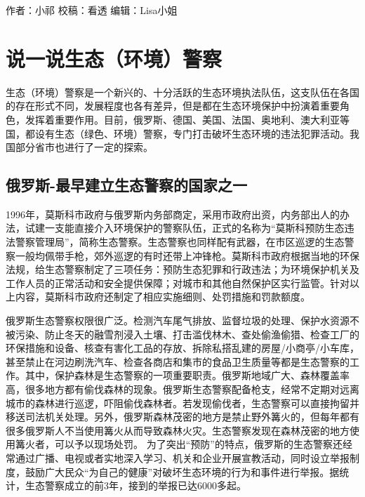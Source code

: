 \documentclass[
]{book}
\begin{document}
作者：小祁
校稿：看透
编辑：Lisa小姐

\hypertarget{ux8bf4ux4e00ux8bf4ux751fux6001ux73afux5883ux8b66ux5bdf}{%
\section{说一说生态（环境）警察}\label{ux8bf4ux4e00ux8bf4ux751fux6001ux73afux5883ux8b66ux5bdf}}

生态（环境）警察是一个新兴的、十分活跃的生态环境执法队伍，这支队伍在各国的存在形式不同，发展程度也各有差异，但是都在生态环境保护中扮演着重要角色，发挥着重要作用。目前，俄罗斯、德国、美国、法国、奥地利、澳大利亚等国，都设有生态（绿色、环境）警察，专门打击破坏生态环境的违法犯罪活动。我国部分省市也进行了一定的探索。

\hypertarget{ux4fc4ux7f57ux65af-ux6700ux65e9ux5efaux7acbux751fux6001ux8b66ux5bdfux7684ux56fdux5bb6ux4e4bux4e00}{%
\subsection{俄罗斯-最早建立生态警察的国家之一}\label{ux4fc4ux7f57ux65af-ux6700ux65e9ux5efaux7acbux751fux6001ux8b66ux5bdfux7684ux56fdux5bb6ux4e4bux4e00}}

1996年，莫斯科市政府与俄罗斯内务部商定，采用市政府出资，内务部出人的办法，试建一支能直接介入环境保护的警察队伍，正式的名称为``莫斯科预防生态违法警察管理局''，简称生态警察。生态警察也同样配有武器，在市区巡逻的生态警察一般均佩带手枪，郊外巡逻的有时还带上冲锋枪。莫斯科市政府根据当地的环保法规，给生态警察制定了三项任务：预防生态犯罪和行政违法；为环境保护机关及工作人员的正常活动和安全提供保障；对城市和其他自然保护区实行监管。针对以上内容，莫斯科市政府还制定了相应实施细则、处罚措施和罚款额度。

俄罗斯生态警察权限很广泛。检测汽车尾气排放、监督垃圾的处理、保护水资源不被污染、防止冬天的融雪剂浸入土壤、打击滥伐林木、查处偷渔偷猎、检查工厂的环保措施和设备、核查有害化工品的存放、拆除私搭乱建的房屋/小商亭/小车库，甚至禁止在河边刷洗汽车、检查各商店和集市的食品卫生质量等都是生态警察的工作。其中，保护森林是生态警察的一项重要职责。俄罗斯地域广大、森林覆盖率高，很多地方都有偷伐森林的现象。俄罗斯生态警察配备枪支，经常不定期对远离城市的森林进行巡逻，吓阻偷伐森林者。若发现偷伐者，生态警察可以直接拘留并移送司法机关处理。另外，俄罗斯森林茂密的地方是禁止野外篝火的，但每年都有很多俄罗斯人不当使用篝火从而导致森林火灾。生态警察发现在森林茂密的地方使用篝火者，可以予以现场处罚。
为了突出``预防''的特点，俄罗斯的生态警察还经常通过广播、电视或者实地深入学习、机关和企业开展宣教活动，同时设立举报制度，鼓励广大民众``为自己的健康''对破坏生态环境的行为和事件进行举报。据统计，生态警察成立的前3年，接到的举报已达6000多起。
\end{document}
